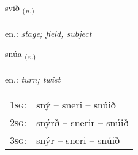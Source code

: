 \documentclass[frontgrid, backgrid]{flacards}\usepackage[]{graphicx}\usepackage[]{xcolor}
\begin{document}
\renewcommand{\blhead}{\vskip5pt {\small\bfseries\footnotesize Nafnorð | Noun }}
\renewcommand{\bcfoot}{\vskip5pt \hspace{2pt}{\small\bfseries\footnotesize 1K}}


{svið \small{\textsubscript{(\textit{n.})}} \\[1ex] %
\textphonetic{[svɪːð]} \\
en.: \emph{stage; field, subject} \\  [2ex]
\renewcommand*{\arraystretch}{0.8}
}

\renewcommand{\flhead}{\vskip5pt \fboxsep=0pt {\small\bfseries\footnotesize Sagnorð | Verb}}
\renewcommand{\fcfoot}{\vskip5pt \fboxsep=0pt \hspace{2pt}{\small\bfseries\footnotesize 1K}}

\renewcommand{\blhead}{\vskip5pt {\small\bfseries\footnotesize Sagnorð | Verb }}
\renewcommand{\bcfoot}{\vskip5pt \hspace{2pt}{\small\bfseries\footnotesize 1K}}


{snúa \small{\textsubscript{(\textit{v.})}} \\[1ex] %
\textphonetic{[stnuːa]} \\
en.: \emph{turn; twist} \\  [2ex]
\renewcommand*{\arraystretch}{0.8}
\begin{tabular}{p{1cm}l}
\textsc{1sg}: & sný -- sneri -- snúið \\ 
\textsc{2sg}: & snýrð -- snerir -- snúið \\ 
\textsc{3sg}: & snýr -- sneri -- snúið \\ 
\end{tabular}
}

\renewcommand{\flhead}{\vskip5pt \fboxsep=0pt {\small\bfseries\footnotesize Nafnorð | Noun}}
\renewcommand{\fcfoot}{\vskip5pt \fboxsep=0pt \hspace{2pt}{\small\bfseries\footnotesize 1K}}
\end{document}
